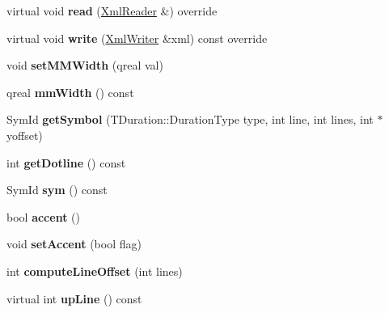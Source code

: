 \begin{DoxyCompactItemize}
virtual void {\bfseries read} (\hyperlink{class_ms_1_1_xml_reader}{Xml\+Reader} \&) override
\item 
\mbox{\label{class_ms_1_1_rest_ada8ef621b5db99baa4c4c5ec96cf2ee7}} 
virtual void {\bfseries write} (\hyperlink{class_ms_1_1_xml_writer}{Xml\+Writer} \&xml) const override
\item 
\mbox{\label{class_ms_1_1_rest_a61580808cbac88c3cef23957f100390b}} 
void {\bfseries set\+M\+M\+Width} (qreal val)
\item 
\mbox{\label{class_ms_1_1_rest_abc44bc62f92b4b4d0c2770d13e84660f}} 
qreal {\bfseries mm\+Width} () const
\item 
\mbox{\label{class_ms_1_1_rest_a897e507bbc31827f03d5f5ead408c73c}} 
Sym\+Id {\bfseries get\+Symbol} (T\+Duration\+::\+Duration\+Type type, int line, int lines, int $\ast$yoffset)
\item 
\mbox{\label{class_ms_1_1_rest_a12f676d763885b9dec742bb3c2bf0023}} 
int {\bfseries get\+Dotline} () const
\item 
\mbox{\label{class_ms_1_1_rest_ab3cfe4a44771a4f55d5e96eb1da2fdbc}} 
Sym\+Id {\bfseries sym} () const
\item 
\mbox{\label{class_ms_1_1_rest_a744ec89fe60e909904233747e7ee634d}} 
bool {\bfseries accent} ()
\item 
\mbox{\label{class_ms_1_1_rest_a2be055ab24bb6b935f72a5f5e9c47fc2}} 
void {\bfseries set\+Accent} (bool flag)
\item 
\mbox{\label{class_ms_1_1_rest_a52ac4bfd13fd4db565e179c2b26545f6}} 
int {\bfseries compute\+Line\+Offset} (int lines)
\item 
\mbox{\label{class_ms_1_1_rest_ac1f706d6add7a7ac03e06ac254a2c87a}} 
virtual int {\bfseries up\+Line} () const
\item 
\mbox{\label{class_ms_1_1_rest_a3d126b63868ac5bb757f61655d4712fd}} 

\end{DoxyCompactItemize}
